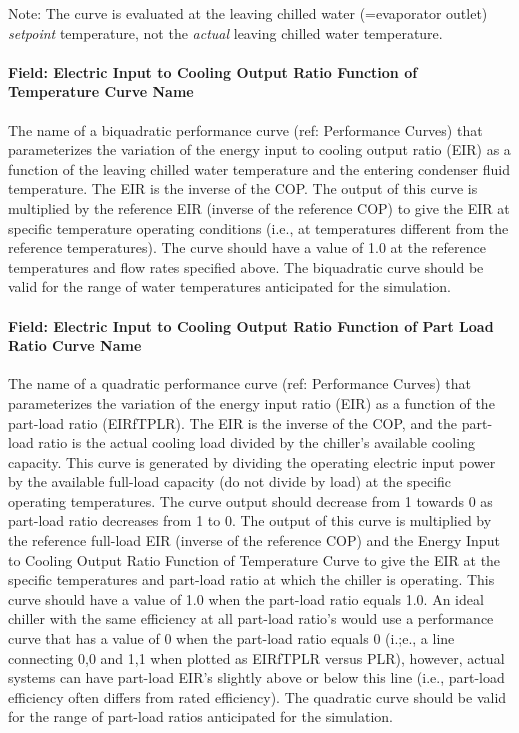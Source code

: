 Note: The curve is evaluated at the leaving chilled water (=evaporator outlet) \emph{setpoint} temperature, not the \emph{actual} leaving chilled water temperature.

\paragraph{Field: Electric Input to Cooling Output Ratio Function of Temperature Curve Name}\label{field-electric-input-to-cooling-output-ratio-function-of-temperature-curve-name}

The name of a biquadratic performance curve (ref: Performance Curves) that parameterizes the variation of the energy input to cooling output ratio (EIR) as a function of the leaving chilled water temperature and the entering condenser fluid temperature. The EIR is the inverse of the COP. The output of this curve is multiplied by the reference EIR (inverse of the reference COP) to give the EIR at specific temperature operating conditions (i.e., at temperatures different from the reference temperatures). The curve should have a value of 1.0 at the reference temperatures and flow rates specified above. The biquadratic curve should be valid for the range of water temperatures anticipated for the simulation.

\paragraph{Field: Electric Input to Cooling Output Ratio Function of Part Load Ratio Curve Name}\label{field-electric-input-to-cooling-output-ratio-function-of-part-load-ratio-curve-name}

The name of a quadratic performance curve (ref: Performance Curves) that parameterizes the variation of the energy input ratio (EIR) as a function of the part-load ratio (EIRfTPLR). The EIR is the inverse of the COP, and the part-load ratio is the actual cooling load divided by the chiller's available cooling capacity. This curve is generated by dividing the operating electric input power by the available full-load capacity (do not divide by load) at the specific operating temperatures. The curve output should decrease from 1 towards 0 as part-load ratio decreases from 1 to 0. The output of this curve is multiplied by the reference full-load EIR (inverse of the reference COP) and the Energy Input to Cooling Output Ratio Function of Temperature Curve to give the EIR at the specific temperatures and part-load ratio at which the chiller is operating. This curve should have a value of 1.0 when the part-load ratio equals 1.0. An ideal chiller with the same efficiency at all part-load ratio's would use a performance curve that has a value of 0 when the part-load ratio equals 0 (i.;e., a line connecting 0,0 and 1,1 when plotted as EIRfTPLR versus PLR), however, actual systems can have part-load EIR's slightly above or below this line (i.e., part-load efficiency often differs from rated efficiency). The quadratic curve should be valid for the range of part-load ratios anticipated for the simulation.

